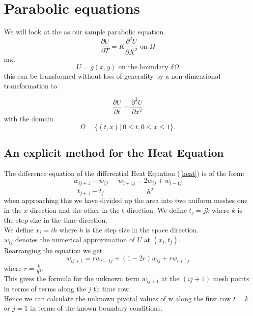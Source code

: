 \chapter{Parabolic equations}
We will look at the  as our sample parabolic equation.
\[ \frac{\partial U}{\partial T}=K\frac{\partial^2U }{\partial X^2} \mbox{ on } \Omega \]
and 
\[ U=g(x,y) \mbox{ on the boundary } \delta\Omega \]
this can be transformed without loss of generality by a non-dimensional transformation to

\begin{equation}\label{heat} \frac{\partial U}{\partial t}=\frac{\partial^2U }{\partial x^2}\end{equation}
with the domain
\[\Omega=\{(t,x)| \ 0\leq t, 0 \leq x \leq 1\}. \]

\section{An explicit method for the Heat Equation}
The difference equation of the differential Heat Equation (\ref{heat}) is of the form:
\begin{equation}
\frac{w_{ij+1}-w_{ij}}{t_{j+1}-t_{j}}=\frac{w_{i+1j}-2w_{ij}+w_{i-1j}}{h^2}
\end{equation}
when approaching this we have divided up the area into
two uniform meshes one in the $x$ direction and the other in the t-direction.
We define $t_j=jk$ where $k$ is the step size in the time direction.\\
We define $x_i=ih$ where $h$ is the step size in the space direction.\\
$w_{ij}$ denotes the numerical approximation of $U$ at $(x_i,t_j)$.\\
Rearranging the equation we get
\begin{equation}\label{disc heat}
w_{ij+1}=rw_{i-1j}+(1-2r)w_{ij}+rw_{i+1j}
\end{equation}
where $r=\frac{k}{h^2}$.\\
This gives the formula for the unknown term $w_{ij+1}$ at the $(ij+1)$ mesh points
in terms of terms along the $j$ th time row.\\
Hence we can calculate the unknown pivotal values of w along the first row $t=k$ or $j=1$ in terms of the known boundary conditions.
